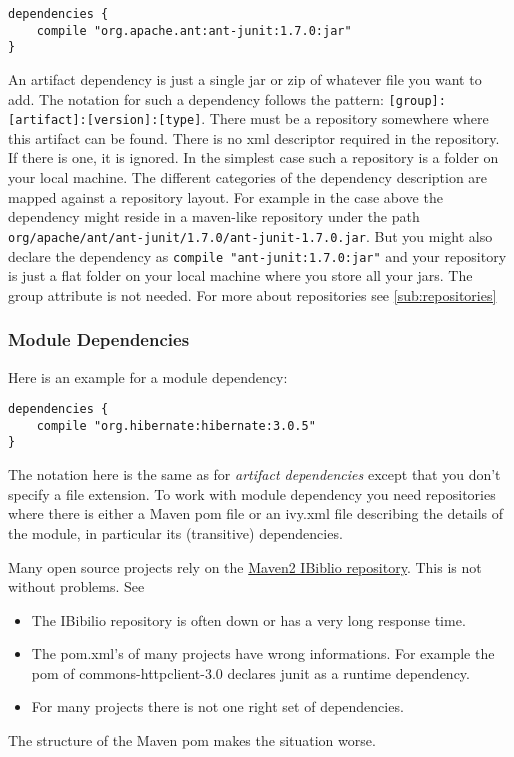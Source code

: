 \begin{Verbatim}
dependencies {
	compile "org.apache.ant:ant-junit:1.7.0:jar"
}
\end{Verbatim}

An artifact dependency is just a single jar or zip of whatever file you want to add. The notation for such a dependency follows the  pattern: \texttt{[group]:[artifact]:[version]:[type]}. There must be a repository somewhere where this artifact can be found. There is no xml descriptor required in the repository. If there is one, it is ignored. In the simplest case such a repository is a folder on your local machine. The different categories of the dependency description are mapped against a repository layout. For example in the case above the dependency might reside in a maven-like repository under the path \texttt{org/apache/ant/ant-junit/1.7.0/ant-junit-1.7.0.jar}. But you might also declare the dependency as \texttt{compile "ant-junit:1.7.0:jar"} and your repository is just a flat folder on your local machine where you store all your jars. The group attribute is not needed. For more about repositories see \ref{sub:repositories}

\subsubsection{Module Dependencies} %
\label{ssub:module_dependencies}
Here is an example for a module dependency:

\begin{Verbatim}
dependencies {
	compile "org.hibernate:hibernate:3.0.5"
}
\end{Verbatim}

The notation here is the same as for \emph{artifact dependencies} except that you don't specify a file extension. To work with module dependency you need repositories where there is either a Maven pom file or an ivy.xml file describing the details of the module, in particular its (transitive) dependencies. 

Many open source projects rely on the \href{http://repo1.maven.org/maven2}{Maven2 IBiblio repository}. This is not without problems. See 

\begin{itemize}
	\item The IBibilio repository is often down or has a very long response time.
	\item The pom.xml's of many projects have wrong informations. For example the pom of commons-httpclient-3.0 declares junit as a runtime dependency.
	\item For many projects there is not one right set of dependencies. 
\end{itemize} 
The structure of the Maven pom makes the situation worse.


